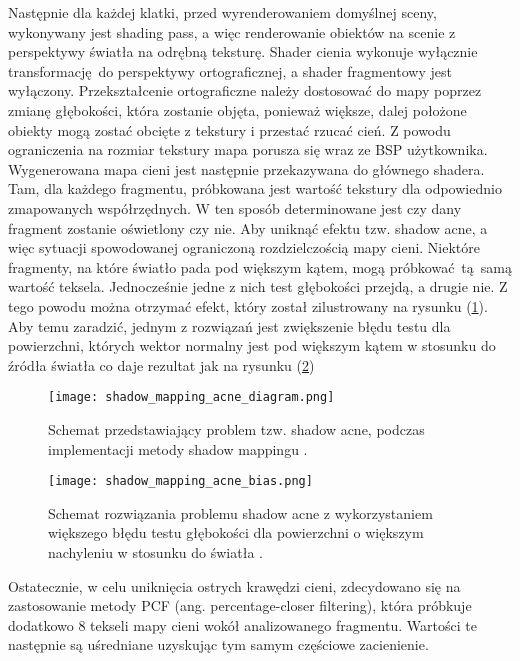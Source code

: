 Następnie dla każdej klatki, przed wyrenderowaniem domyślnej sceny, wykonywany jest shading pass, a więc renderowanie obiektów na scenie z perspektywy światła na odrębną teksturę. Shader cienia wykonuje wyłącznie transformację do perspektywy ortograficznej, a shader fragmentowy jest wyłączony. Przekształcenie ortograficzne należy dostosować do mapy poprzez zmianę głębokości, która zostanie objęta, ponieważ większe, dalej położone obiekty mogą zostać obcięte z tekstury i przestać rzucać cień. Z powodu ograniczenia na rozmiar tekstury mapa porusza się wraz ze BSP użytkownika. 
\\

Wygenerowana mapa cieni jest następnie przekazywana do głównego shadera. Tam, dla każdego fragmentu, próbkowana jest wartość tekstury dla odpowiednio zmapowanych współrzędnych. W ten sposób determinowane jest czy dany fragment zostanie oświetlony czy nie. 
Aby uniknąć efektu tzw. shadow acne, a więc sytuacji spowodowanej ograniczoną rozdzielczością mapy cieni. Niektóre fragmenty, na które światło pada pod większym kątem, mogą próbkować tą samą wartość teksela. Jednocześnie jedne z nich test głębokości przejdą, a drugie nie. Z tego powodu można otrzymać efekt, który został zilustrowany na rysunku (\ref{shadow_mapping_acne_diagram}). Aby temu zaradzić, jednym z rozwiązań jest zwiększenie błędu testu dla powierzchni, których wektor normalny jest pod większym kątem w stosunku do źródła światła co daje rezultat jak na rysunku (\ref{shadow_mapping_acne_bias})
\\

\begin{figure}[h]
	\centering
	\texttt{[image: shadow\_mapping\_acne\_diagram.png]}
	\caption{Schemat przedstawiający problem tzw. shadow acne, podczas implementacji metody shadow mappingu \cite{learnopengl}.}
	\label{shadow_mapping_acne_diagram}
\end{figure}

\begin{figure}[h]
\centering
\texttt{[image: shadow\_mapping\_acne\_bias.png]}
\caption{Schemat rozwiązania problemu shadow acne z wykorzystaniem większego błędu testu głębokości dla powierzchni o większym nachyleniu w stosunku do światła \cite{learnopengl}.}
\label{shadow_mapping_acne_bias}
\end{figure}

Ostatecznie, w celu uniknięcia ostrych krawędzi cieni, zdecydowano się na zastosowanie metody PCF (ang. percentage-closer filtering), która próbkuje dodatkowo 8 tekseli mapy cieni wokół analizowanego fragmentu. Wartości te następnie są uśredniane uzyskując tym samym częściowe zacienienie.

